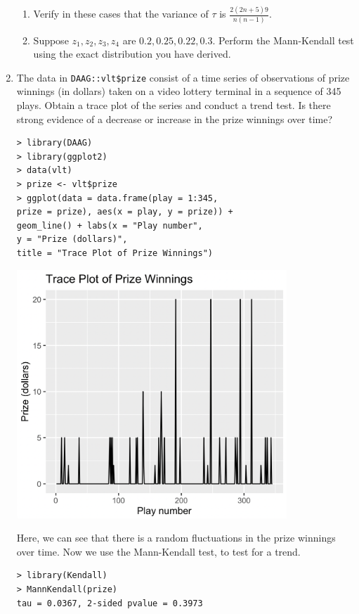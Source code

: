 \documentclass[12pt]{article}
\begin{document}
\begin{enumerate}
\begin{enumerate}
            
            \item Verify in these cases that the variance of \( \tau \) is \( \frac{2(2n+5)9}{n(n-1)} \).
            \item Suppose \( z_1, z_2, z_3, z_4 \) are \( 0.2, 0.25, 0.22, 0.3 \). Perform the Mann-Kendall test using the exact distribution you have derived.
        \end{enumerate}
        
    \item The data in \verb|DAAG::vlt$prize| consist of a time series of observations of prize
        winnings (in dollars) taken on a video lottery terminal in a sequence of 345 plays. Obtain
        a trace plot of the series and conduct a trend test. Is there strong evidence of a decrease
        or increase in the prize winnings over time?
    \begin{verbatim}
> library(DAAG)
> library(ggplot2)
> data(vlt)
> prize <- vlt$prize
> ggplot(data = data.frame(play = 1:345, 
prize = prize), aes(x = play, y = prize)) +
geom_line() + labs(x = "Play number", 
y = "Prize (dollars)", 
title = "Trace Plot of Prize Winnings")
    \end{verbatim}
    \begin{center}
        \includegraphics[width=0.8\textwidth]{traceplot.png}
    \end{center}
    Here, we can see that there is a random fluctuations in the prize winnings over time. 
    Now we use the Mann-Kendall test, to test for a trend.
    \begin{verbatim}
> library(Kendall)
> MannKendall(prize)
tau = 0.0367, 2-sided pvalue = 0.3973

\end{verbatim}
\end{enumerate}
\end{document}
